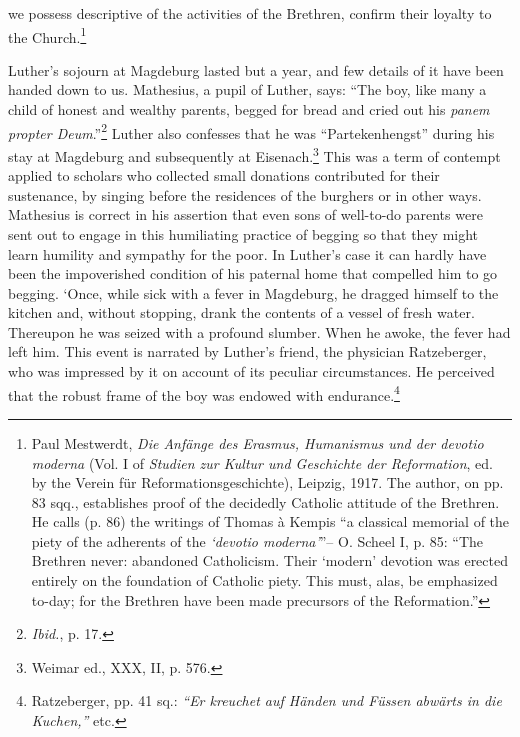 we possess descriptive of the activities of the Brethren, confirm their
loyalty to the Church.\footnote
{Paul Mestwerdt, \textit{Die Anfänge des Erasmus, Humanismus und der devotio moderna}
(Vol. I of \textit{Studien zur Kultur und Geschichte der Reformation}, ed. by the Verein für
Reformationsgeschichte), Leipzig, 1917. The author, on pp. 83 sqq., establishes proof of
the decidedly Catholic attitude of the Brethren. He calls (p. 86) the writings of Thomas
à Kempis “a classical memorial of the piety of the adherents of the \textit{‘devotio moderna’}”--
O. Scheel I, p. 85: “The Brethren never: abandoned Catholicism. Their ‘modern’ devotion
was erected entirely on the foundation of Catholic piety. This must, alas, be emphasized
to-day; for the Brethren have been made precursors of the Reformation.”
}

Luther’s sojourn at Magdeburg lasted but a year, and few details
of it have been handed down to us. Mathesius, a pupil of Luther,
says: “The boy, like many a child of honest and wealthy parents,
begged for bread and cried out his \textit{panem propter Deum}.”\footnote{\textit{Ibid.}, p. 17.}
Luther
also confesses that he was “Partekenhengst” during his stay at Magdeburg
and subsequently at Eisenach.\footnote{Weimar ed., XXX, II, p. 576.}
This was a term of contempt
applied to scholars who collected small donations contributed for their
sustenance, by singing before the residences of the burghers or in other
ways. Mathesius is correct in his assertion that even sons of well-to-do
parents were sent out to engage in this humiliating practice of begging
so that they might learn humility and sympathy for the poor. In
Luther’s case it can hardly have been the impoverished condition of
his paternal home that compelled him to go begging.
‘Once, while sick with a fever in Magdeburg, he dragged himself to
the kitchen and, without stopping, drank the contents of a vessel of
fresh water. Thereupon he was seized with a profound slumber. When
he awoke, the fever had left him. This event is narrated by Luther’s
friend, the physician Ratzeberger, who was impressed by it on account
of its peculiar circumstances. He perceived that the robust
frame of the boy was endowed with endurance.\footnote{Ratzeberger, pp. 41 sq.: \textit{“Er kreuchet auf Händen und Füssen abwärts in die Kuchen,”} etc.}

